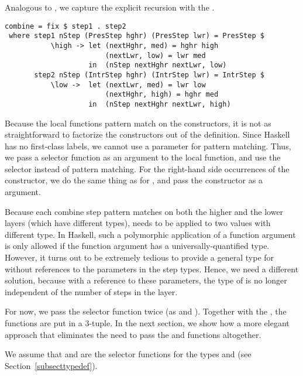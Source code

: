 \documentclass[preprint,natbib]{sigplanconf}
\begin{document}
Analogous to , we capture the explicit recursion with the .

\begin{small} %
\begin{verbatim}
combine = fix $ step1 . step2
 where step1 nStep (PresStep hghr) (PresStep lwr) = PresStep $
           \high -> let (nextHghr, med) = hghr high
                        (nextLwr, low) = lwr med
                    in  (nStep nextHghr nextLwr, low)
       step2 nStep (IntrStep hghr) (IntrStep lwr) = IntrStep $
           \low ->  let (nextLwr, med) = lwr low
                        (nextHghr, high) = hghr med
                    in  (nStep nextHghr nextLwr, high)
\end{verbatim}
\end{small}

Because the local functions pattern match on the constructors, it is not as straightforward to factorize the constructors out of the definition. Since Haskell has no first-class labels, we cannot use a parameter for pattern matching. Thus, we pass a selector function  as an argument to the local function, and use the selector instead of pattern matching. For the right-hand side occurrences of the constructor, we do the same thing as for , and pass the constructor as a  argument.


Because each combine step pattern matches on both the higher and the lower layers (which have different types),  needs to be applied to two values with different type. In Haskell, such a polymorphic application of a function argument is only allowed if the function argument has a universally-quantified type. However, it turns out to be extremely tedious to provide a general type for  without references to the parameters in the step types. Hence, we need a different solution, because with a reference to these parameters, the type of  is no longer independent of the number of steps in the layer.

For now, we pass the selector function twice (as  and ).  Together with the , the  functions are put in a 3-tuple. In the next section, we show how a more elegant approach that eliminates the need to pass the  and  functions altogether.

We assume that  and  are the selector functions for the types  and  (see Section~\ref{subsecttypedef}).
\end{document}
